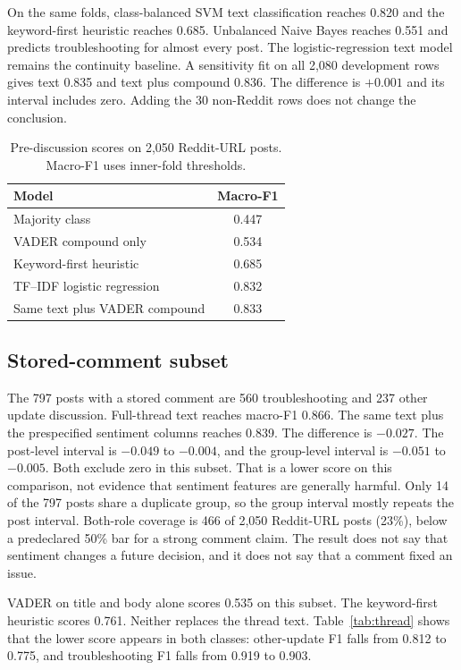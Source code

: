 \documentclass[conference,letterpaper]{IEEEtran}
\begin{document}
On the same folds, class-balanced SVM text classification reaches 0.820 and the keyword-first heuristic reaches 0.685. Unbalanced Naive Bayes reaches 0.551 and predicts troubleshooting for almost every post. The logistic-regression text model remains the continuity baseline. A sensitivity fit on all 2,080 development rows gives text 0.835 and text plus compound 0.836. The difference is $+0.001$ and its interval includes zero. Adding the 30 non-Reddit rows does not change the conclusion.

\begin{table}[t]
\caption{Pre-discussion scores on 2,050 Reddit-URL posts. Macro-F1 uses inner-fold thresholds.}
\label{tab:pre}
\centering
\begin{tabular}{lc}
\toprule
Model & Macro-F1 \\
\midrule
Majority class & 0.447 \\
VADER compound only & 0.534 \\
Keyword-first heuristic & 0.685 \\
TF--IDF logistic regression & 0.832 \\
Same text plus VADER compound & 0.833 \\
\bottomrule
\end{tabular}
\end{table}

\subsection{Stored-comment subset}
The 797 posts with a stored comment are 560 troubleshooting and 237 other update discussion. Full-thread text reaches macro-F1 0.866. The same text plus the prespecified sentiment columns reaches 0.839. The difference is $-0.027$. The post-level interval is $-0.049$ to $-0.004$, and the group-level interval is $-0.051$ to $-0.005$. Both exclude zero in this subset. That is a lower score on this comparison, not evidence that sentiment features are generally harmful. Only 14 of the 797 posts share a duplicate group, so the group interval mostly repeats the post interval. Both-role coverage is 466 of 2,050 Reddit-URL posts (23\%), below a predeclared 50\% bar for a strong comment claim. The result does not say that sentiment changes a future decision, and it does not say that a comment fixed an issue.

VADER on title and body alone scores 0.535 on this subset. The keyword-first heuristic scores 0.761. Neither replaces the thread text. Table~\ref{tab:thread} shows that the lower score appears in both classes: other-update F1 falls from 0.812 to 0.775, and troubleshooting F1 falls from 0.919 to 0.903.
\end{document}
